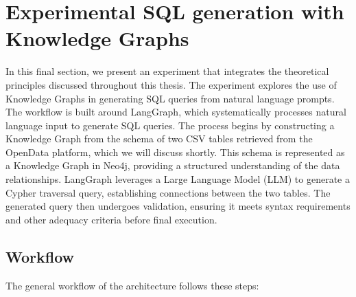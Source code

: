\section{Experimental SQL generation with Knowledge Graphs}
In this final section, we present an experiment that integrates the theoretical principles discussed throughout this thesis. The experiment explores the use of Knowledge Graphs in generating SQL queries from natural language prompts. The workflow is built around LangGraph, which systematically processes natural language input to generate SQL queries. The process begins by constructing a Knowledge Graph from the schema of two CSV tables retrieved from the OpenData platform, which we will discuss shortly. This schema is represented as a Knowledge Graph in Neo4j, providing a structured understanding of the data relationships. LangGraph leverages a Large Language Model (LLM) to generate a Cypher traversal query, establishing connections between the two tables. The generated query then undergoes validation, ensuring it meets syntax requirements and other adequacy criteria before final execution.
\subsection{Workflow}

The general workflow of the architecture follows these steps:

